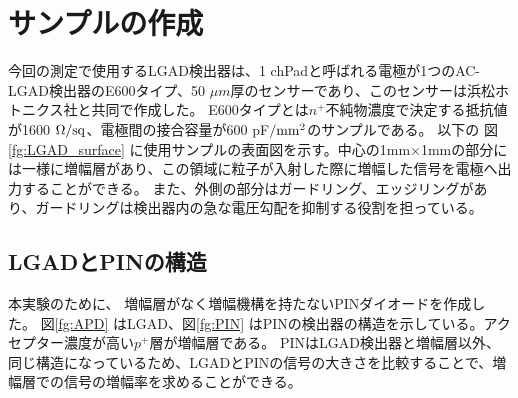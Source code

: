\section{サンプルの作成}
今回の測定で使用するLGAD検出器は、1 chPadと呼ばれる電極が1つのAC-LGAD検出器のE600タイプ、50 $\mu m$厚のセンサーであり、このセンサーは浜松ホトニクス社と共同で作成した。
E600タイプとは${n}^+$不純物濃度で決定する抵抗値が1600 $\Omega / \rm{sq}$、電極間の接合容量が600 pF$/\rm{mm}^2$のサンプルである。
以下の 図\ref{fg:LGAD_surface} に使用サンプルの表面図を示す。中心の1mm×1mmの部分には一様に増幅層があり、この領域に粒子が入射した際に増幅した信号を電極へ出力することができる。
また、外側の部分はガードリング、エッジリングがあり、ガードリングは検出器内の急な電圧勾配を抑制する役割を担っている。

\subsection{LGADとPINの構造}
本実験のために、%
増幅層がなく増幅機構を持たないPINダイオードを作成した。
図\ref{fg:APD} はLGAD、図\ref{fg:PIN} はPINの検出器の構造を示している。アクセプター濃度が高い${p}^+$層が増幅層である。
PINはLGAD検出器と増幅層以外、同じ構造になっているため、LGADとPINの信号の大きさを比較することで、増幅層での信号の増幅率を求めることができる。

